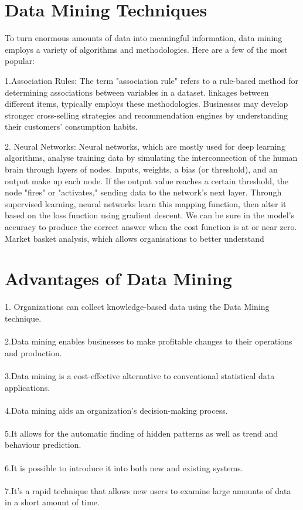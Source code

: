 \documentclass[12pt,letterpaper]{article}
\begin{document}
\section{Data Mining Techniques}
To turn enormous amounts of data into meaningful information, data mining employs a variety of algorithms and methodologies. Here are a few of the most popular:

1.Association Rules: The term "association rule" refers to a rule-based method for determining associations between variables in a dataset.  linkages between different items, typically employs these methodologies. Businesses may develop stronger cross-selling strategies and recommendation engines by understanding their customers' consumption habits.

2. Neural Networks: Neural networks, which are mostly used for deep learning algorithms, analyse training data by simulating the interconnection of the human brain through layers of nodes. Inputs, weights, a bias (or threshold), and an output make up each node. If the output value reaches a certain threshold, the node "fires" or "activates," sending data to the network's next layer. Through supervised learning, neural networks learn this mapping function, then alter it based on the loss function using gradient descent. We can be sure in the model's accuracy to produce the correct answer when the cost function is at or near zero.
Market basket analysis, which allows organisations to better understand

\section{Advantages of Data Mining}
1. Organizations can collect knowledge-based data using the Data Mining technique.\\
\\
2.Data mining enables businesses to make profitable changes to their operations and production.\\
\\
3.Data mining is a cost-effective alternative to conventional statistical data applications.\\
\\
4.Data mining aids an organization's decision-making process.\\
\\
5.It allows for the automatic finding of hidden patterns as well as trend and behaviour prediction.\\
\\
6.It is possible to introduce it into both new and existing systems.\\
\\
7.It's a rapid technique that allows new users to examine large amounts of data in a short amount of time.\\
\end{document}
